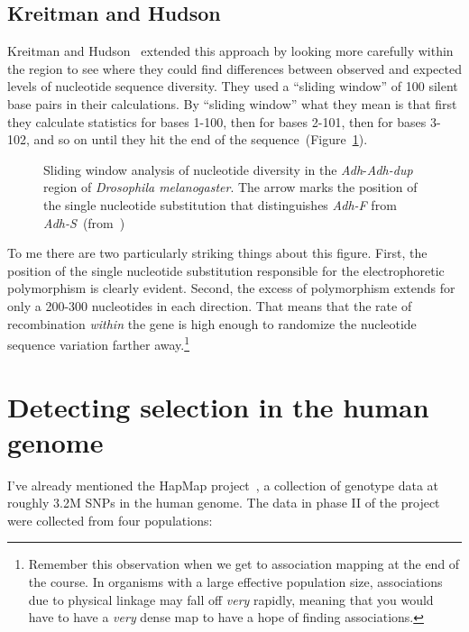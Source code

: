 \subsection*{Kreitman and Hudson}

Kreitman and Hudson~\cite{Kreitman-Hudson91} extended this approach by
looking more carefully within the region to see where they could find
differences between observed and expected levels of nucleotide
sequence diversity. They used a ``sliding window'' of 100 silent base
pairs in their calculations. By ``sliding window'' what they mean is
that first they calculate statistics for bases 1-100, then for bases
2-101, then for bases 3-102, and so on until they hit the end of the
sequence~(Figure~\ref{fig:kh}).

\begin{figure}
\begin{center}
\end{center}
\caption{Sliding window analysis of nucleotide diversity in the {\it
    Adh\/}-{\it Adh-dup} region of {\it Drosophila melanogaster}. The
  arrow marks the position of the single nucleotide substitution that
  distinguishes {\it Adh-F\/} from {\it
    Adh-S\/}~(from~\cite{Kreitman-Hudson91})}\label{fig:kh}
\end{figure}

To me there are two particularly striking things about this
figure. First, the position of the single nucleotide substitution
responsible for the electrophoretic polymorphism is clearly
evident. Second, the excess of polymorphism extends for only a 200-300
nucleotides in each direction. That means that the rate of
recombination {\it within\/} the gene is high enough to randomize the
nucleotide sequence variation farther away.\footnote{Remember this
  observation when we get to association mapping at the end of the
  course. In organisms with a large effective population size,
  associations due to physical linkage may fall off {\it very\/}
  rapidly, meaning that you would have to have a {\it very\/} dense
  map to have a hope of finding associations.}

\section*{Detecting selection in the human genome}

I've already mentioned the HapMap project~\cite{HapMap-2007}, a
collection of genotype data at roughly 3.2M SNPs in the human
genome. The data in phase II of the project were collected from four
populations:

